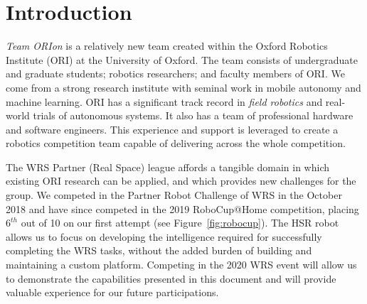 \documentclass[runningheads,a4paper]{llncs}
\newcommand{\teamori}{Team ORIon}
\begin{document}

\section{Introduction}

\textit{\teamori{}} is a relatively new team created within the Oxford Robotics Institute
(ORI) at the University of Oxford. The team consists of undergraduate and
graduate students; robotics researchers; and faculty members of ORI. We come
from a strong research institute with seminal work in mobile autonomy and
machine learning. ORI has a significant track record in \emph{field robotics}
and real-world trials of autonomous systems. It also has a team of professional
hardware and software engineers. This experience and support is leveraged
to create a robotics competition team capable of delivering across the whole
competition. 

The WRS Partner (Real Space) league affords a tangible domain in
which existing ORI research can be applied, and which provides new challenges
for the group.
We competed in the Partner Robot Challenge of WRS in the October 2018 and have since competed in the 2019 RoboCup@Home competition, placing $6^{th}$ out of 10 on our first attempt (see Figure~\ref{fig:robocup}). 
The HSR robot allows us to focus on developing the
intelligence required for successfully completing the WRS tasks, 
without the added burden of building and maintaining a custom platform. 
Competing in the 2020 WRS event will allow us to demonstrate 
the capabilities presented in this document and will provide valuable experience
for our future participations.

\end{document}
